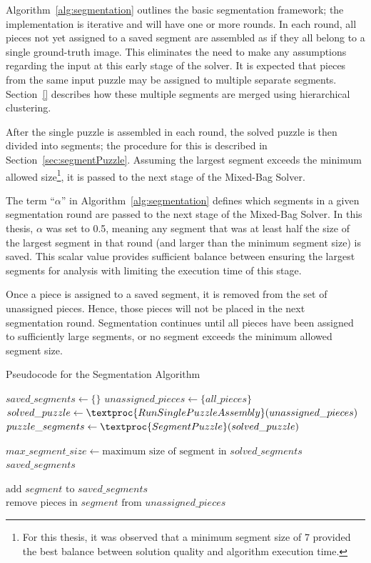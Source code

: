 Algorithm~\ref{alg:segmentation} outlines the basic segmentation framework; the implementation is iterative and will have one or more rounds.  In each round, all pieces not yet assigned to a saved segment are assembled as if they all belong to a single ground-truth image.  This eliminates the need to make any assumptions regarding the input at this early stage of the solver.  It is expected that pieces from the same input puzzle may be assigned to multiple separate segments.  Section~\ref{} describes how these multiple segments are merged using hierarchical clustering.

After the single puzzle is assembled in each round, the solved puzzle is then divided into segments; the procedure for this is described in Section~\ref{sec:segmentPuzzle}.  Assuming the largest segment exceeds the minimum allowed size\footnote{For this thesis, it was observed that a minimum segment size of 7 provided the best balance between solution quality and algorithm execution time.}, it is passed to the next stage of the Mixed-Bag Solver.  

The term ``\textit{$\alpha$}'' in Algorithm~\ref{alg:segmentation} defines which segments in a given segmentation round are passed to the next stage of the Mixed-Bag Solver.  In this thesis, \textit{$\alpha$} was set to 0.5, meaning any segment that was at least half the size of the largest segment in that round (and larger than the minimum segment size) is saved.  This scalar value provides sufficient balance between ensuring the largest segments for analysis with limiting the execution time of this stage.

Once a piece is assigned to a saved segment, it is removed from the set of unassigned pieces.  Hence, those pieces will not be placed in the next segmentation round.  Segmentation continues until all pieces have been assigned to sufficiently large segments, or no segment exceeds the minimum allowed segment size.

\begin{algorithm}[tb]
\caption{Pseudocode for the Segmentation Algorithm}\label{alg:segmentation}
\begin{algorithmic}[1]
    \State $\textit{saved\_segments} \gets \{ \}$
    \State $unassigned\_pieces \gets \{ \textit{all\_pieces} \}$
    \Loop
        \State $solved\_puzzle \gets \textproc{RunSinglePuzzleAssembly}(unassigned\_pieces)$
        \State $puzzle\_segments \gets \textproc{SegmentPuzzle}(solved\_puzzle\text)$
\item[]
        \State $max\_segment\_size \gets \text{maximum size of segment in } solved\_segments$
			\State \Return $saved\_segments$
        \EndIf
\item[]
                \State $\text{add } segment \text{ to } saved\_segments$
                \State $\text{remove pieces in } segment \text{ from } unassigned\_pieces$
            \EndIf
        \EndFor
	\EndLoop
\EndFunction
\end{algorithmic}
\end{algorithm}

